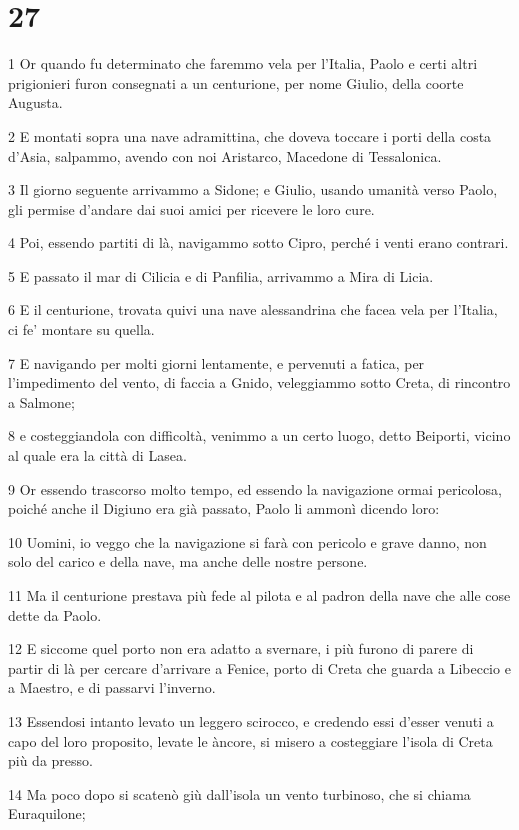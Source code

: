 \chapter{27}

\par 1 Or quando fu determinato che faremmo vela per l'Italia, Paolo e certi altri prigionieri furon consegnati a un centurione, per nome Giulio, della coorte Augusta.
\par 2 E montati sopra una nave adramittina, che doveva toccare i porti della costa d'Asia, salpammo, avendo con noi Aristarco, Macedone di Tessalonica.
\par 3 Il giorno seguente arrivammo a Sidone; e Giulio, usando umanità verso Paolo, gli permise d'andare dai suoi amici per ricevere le loro cure.
\par 4 Poi, essendo partiti di là, navigammo sotto Cipro, perché i venti erano contrari.
\par 5 E passato il mar di Cilicia e di Panfilia, arrivammo a Mira di Licia.
\par 6 E il centurione, trovata quivi una nave alessandrina che facea vela per l'Italia, ci fe' montare su quella.
\par 7 E navigando per molti giorni lentamente, e pervenuti a fatica, per l'impedimento del vento, di faccia a Gnido, veleggiammo sotto Creta, di rincontro a Salmone;
\par 8 e costeggiandola con difficoltà, venimmo a un certo luogo, detto Beiporti, vicino al quale era la città di Lasea.
\par 9 Or essendo trascorso molto tempo, ed essendo la navigazione ormai pericolosa, poiché anche il Digiuno era già passato, Paolo li ammonì dicendo loro:
\par 10 Uomini, io veggo che la navigazione si farà con pericolo e grave danno, non solo del carico e della nave, ma anche delle nostre persone.
\par 11 Ma il centurione prestava più fede al pilota e al padron della nave che alle cose dette da Paolo.
\par 12 E siccome quel porto non era adatto a svernare, i più furono di parere di partir di là per cercare d'arrivare a Fenice, porto di Creta che guarda a Libeccio e a Maestro, e di passarvi l'inverno.
\par 13 Essendosi intanto levato un leggero scirocco, e credendo essi d'esser venuti a capo del loro proposito, levate le àncore, si misero a costeggiare l'isola di Creta più da presso.
\par 14 Ma poco dopo si scatenò giù dall'isola un vento turbinoso, che si chiama Euraquilone;
